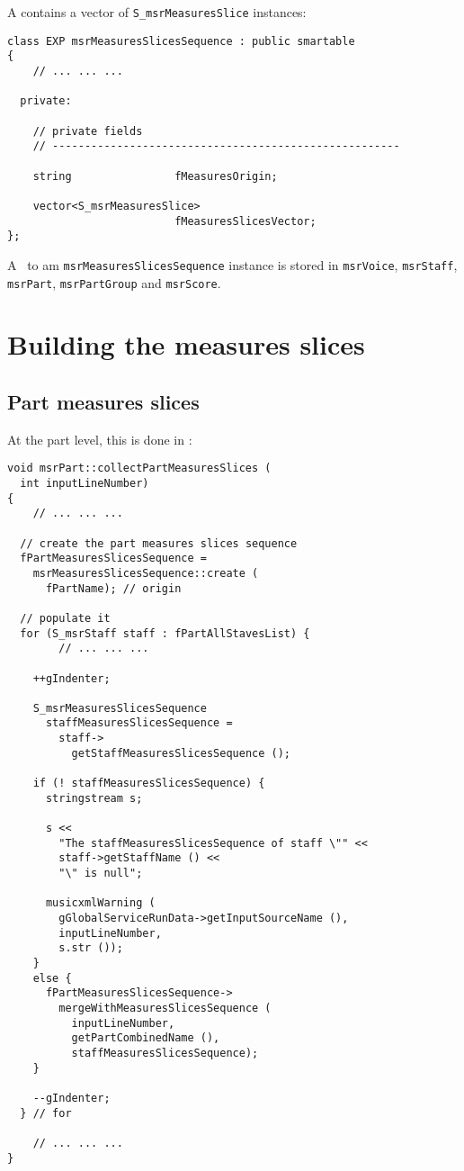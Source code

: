 A  contains a vector of {\tt S_msrMeasuresSlice} instances:
\begin{lstlisting}[language=CPlusPlus]
class EXP msrMeasuresSlicesSequence : public smartable
{
	// ... ... ...

  private:

    // private fields
    // ------------------------------------------------------

    string                fMeasuresOrigin;

    vector<S_msrMeasuresSlice>
                          fMeasuresSlicesVector;
};
\end{lstlisting}

A \smart\ to am {\tt msrMeasuresSlicesSequence} instance is stored in {\tt msrVoice}, {\tt msrStaff}, {\tt msrPart}, {\tt msrPartGroup} and {\tt msrScore}.


\section{Building the measures slices}

\subsection{Part measures slices}

At the part level, this is done in :
\begin{lstlisting}[language=CPlusPlus]
void msrPart::collectPartMeasuresSlices (
  int inputLineNumber)
{
	// ... ... ...

  // create the part measures slices sequence
  fPartMeasuresSlicesSequence =
    msrMeasuresSlicesSequence::create (
      fPartName); // origin

  // populate it
  for (S_msrStaff staff : fPartAllStavesList) {
		// ... ... ...

    ++gIndenter;

    S_msrMeasuresSlicesSequence
      staffMeasuresSlicesSequence =
        staff->
          getStaffMeasuresSlicesSequence ();

    if (! staffMeasuresSlicesSequence) {
      stringstream s;

      s <<
        "The staffMeasuresSlicesSequence of staff \"" <<
        staff->getStaffName () <<
        "\" is null";

      musicxmlWarning (
        gGlobalServiceRunData->getInputSourceName (),
        inputLineNumber,
        s.str ());
    }
    else {
      fPartMeasuresSlicesSequence->
        mergeWithMeasuresSlicesSequence (
          inputLineNumber,
          getPartCombinedName (),
          staffMeasuresSlicesSequence);
    }

    --gIndenter;
  } // for

	// ... ... ...
}
\end{lstlisting}



